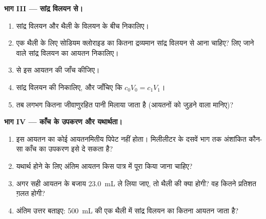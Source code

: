 \begin{problem}
\medskip
\noindent\textbf{भाग III --- सांद्र विलयन से।}
\begin{enumerate}[resume]
  \item सांद्र विलयन और थैली के विलयन के बीच 
        निकालिए।
  \item एक थैली के लिए सोडियम क्लोराइड का कितना द्रव्यमान सांद्र विलयन से आना
        चाहिए? लिए जाने वाले सांद्र विलयन का आयतन
        निकालिए।
  \item {} से इस आयतन की जाँच कीजिए।
  \item सांद्र विलयन की  निकालिए, और
        जाँचिए कि $c_0 V_0 = c_1 V_1$।
  \item तब लगभग कितना जीवाणुरहित पानी मिलाया जाता है (आयतनों को
        जुड़ने वाला मानिए)?
\end{enumerate}

\medskip
\noindent\textbf{भाग IV --- काँच के उपकरण और यथार्थता।}
\begin{enumerate}[resume]
  \item इस आयतन का कोई आयतनमितीय पिपेट नहीं होता। मिलीलीटर के दसवें भाग तक
        अंशांकित कौन-सा काँच का उपकरण इसे दे
        सकता है?
  \item यथार्थ होने के लिए अंतिम आयतन किस पात्र में पूरा किया
        जाना चाहिए?
  \item अगर सही आयतन के बजाय \qty{23.0}{mL} ले लिया जाए, तो थैली की  क्या होगी? वह कितने प्रतिशत ग़लत
        होगी?
  \item अंतिम उत्तर बताइए: \qty{500}{mL} की एक थैली में सांद्र विलयन का कितना
        आयतन जाता है?
\end{enumerate}
\end{problem}
